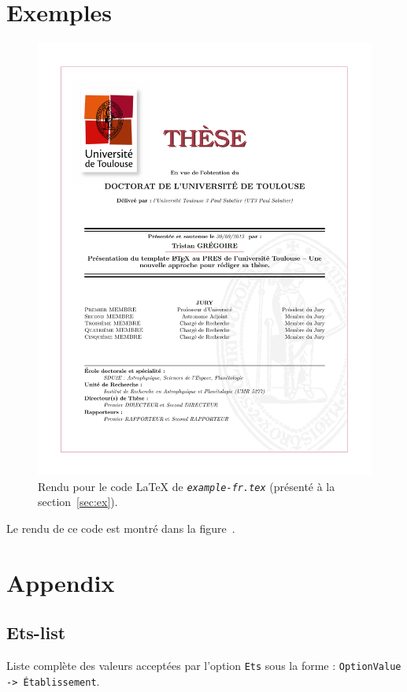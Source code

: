 \documentclass{scrartcl}
\newcommand*{\file}[1]{\textit{\texttt{#1}}}
\begin{document}
\section{Exemples\label{sec:ex}}

\begin{figure}[h!]
    \centering
    \includegraphics[width=\textwidth]{example-fr.pdf}
    \caption{\label{fig:ex}
        Rendu pour le code \LaTeX{} de \file{example-fr.tex} (pr\'esent\'e \`a la section~\ref{sec:ex}).
    }
\end{figure}
Le rendu de ce code est montr\'e dans la figure~.

\newpage
\section*{Appendix}
\subsection{Ets-list\label{ssec:Ets}}
Liste compl\`ete des valeurs accept\'ees par l'option \texttt{Ets} sous la forme :
\texttt{OptionValue -> \'Etablissement}.

\end{document}
